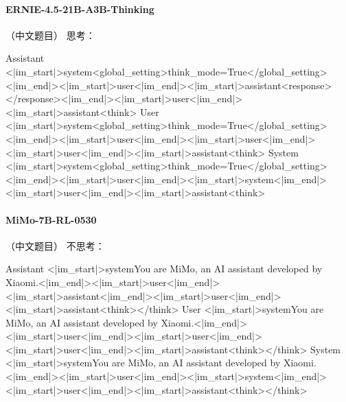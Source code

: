 \paragraph{ERNIE-4.5-21B-A3B-Thinking} （中文题目）
\noindent 思考：
\begin{Rendering}
Assistant  <|im_start|>system\NL{}<global_setting>\NL{}think_mode=True\NL{}</global_setting><|im_end|>\NL{}\NL{}<|im_start|>user\NL{}<|im_end|>\NL{}\NL{}<|im_start|>assistant\NL{}<response>\NL{}\NL{}</response>\NL{}<|im_end|>\NL{}\NL{}<|im_start|>user\NL{}<|im_end|>\NL{}\NL{}<|im_start|>assistant\NL{}<think>\NL{}
User       <|im_start|>system\NL{}<global_setting>\NL{}think_mode=True\NL{}</global_setting><|im_end|>\NL{}\NL{}<|im_start|>user\NL{}<|im_end|>\NL{}\NL{}<|im_start|>user\NL{}<|im_end|>\NL{}\NL{}<|im_start|>user\NL{}<|im_end|>\NL{}\NL{}<|im_start|>assistant\NL{}<think>\NL{}
System     <|im_start|>system\NL{}<global_setting>\NL{}think_mode=True\NL{}</global_setting><|im_end|>\NL{}\NL{}<|im_start|>user\NL{}<|im_end|>\NL{}\NL{}<|im_start|>system\NL{}<|im_end|>\NL{}\NL{}<|im_start|>user\NL{}<|im_end|>\NL{}\NL{}<|im_start|>assistant\NL{}<think>\NL{}
\end{Rendering}
\paragraph{MiMo-7B-RL-0530} （中文题目）
\noindent 不思考：
\begin{Rendering}
Assistant  <|im_start|>system\NL{}You are MiMo, an AI assistant developed by Xiaomi.<|im_end|>\NL{}<|im_start|>user\NL{}<|im_end|>\NL{}<|im_start|>assistant\NL{}<|im_end|>\NL{}<|im_start|>user\NL{}<|im_end|>\NL{}<|im_start|>assistant\NL{}<think>\NL{}\NL{}</think>\NL{}
User       <|im_start|>system\NL{}You are MiMo, an AI assistant developed by Xiaomi.<|im_end|>\NL{}<|im_start|>user\NL{}<|im_end|>\NL{}<|im_start|>user\NL{}<|im_end|>\NL{}<|im_start|>user\NL{}<|im_end|>\NL{}<|im_start|>assistant\NL{}<think>\NL{}\NL{}</think>\NL{}
System     <|im_start|>system\NL{}You are MiMo, an AI assistant developed by Xiaomi.<|im_end|>\NL{}<|im_start|>user\NL{}<|im_end|>\NL{}<|im_start|>system\NL{}<|im_end|>\NL{}<|im_start|>user\NL{}<|im_end|>\NL{}<|im_start|>assistant\NL{}<think>\NL{}\NL{}</think>\NL{}
\end{Rendering}
